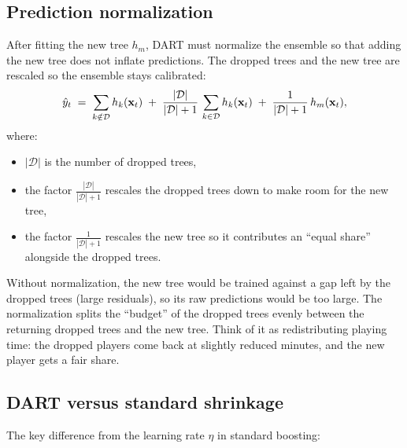 \subsection*{Prediction normalization}

After fitting the new tree $h_m$, DART must normalize the ensemble so that
adding the new tree does not inflate predictions.  The dropped trees and the
new tree are rescaled so the ensemble stays calibrated:
\begin{equation}\label{eq:trees:dart_normalize}
  \hat{y}_t
  \;=\; \sum_{k \notin \mathcal{D}} h_k(\mathbf{x}_t)
  \;+\; \frac{|\mathcal{D}|}{|\mathcal{D}| + 1}\,
  \sum_{k \in \mathcal{D}} h_k(\mathbf{x}_t)
  \;+\; \frac{1}{|\mathcal{D}| + 1}\, h_m(\mathbf{x}_t),
\end{equation}
where:
\begin{itemize}[leftmargin=1.8em]
  \item $|\mathcal{D}|$ is the number of dropped trees,
  \item the factor $\frac{|\mathcal{D}|}{|\mathcal{D}|+1}$ rescales the
        dropped trees down to make room for the new tree,
  \item the factor $\frac{1}{|\mathcal{D}|+1}$ rescales the new tree so it
        contributes an ``equal share'' alongside the dropped trees.
\end{itemize}

\begin{intuition}
Without normalization, the new tree would be trained against a gap left by
the dropped trees (large residuals), so its raw predictions would be too
large.  The normalization splits the ``budget'' of the dropped trees evenly
between the returning dropped trees and the new tree.  Think of it as
redistributing playing time: the dropped players come back at slightly
reduced minutes, and the new player gets a fair share.
\end{intuition}

\subsection*{DART versus standard shrinkage}

The key difference from the learning rate $\eta$ in standard boosting:

